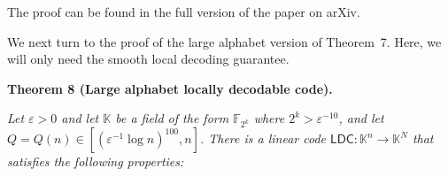 


The proof can be found in the full version of the paper on arXiv.\par




We next turn to the proof of the large alphabet version of Theorem 7. Here, we will only need the smooth local decoding guarantee.\par





\par\medskip\noindent\textbf{
\textbf{Theorem 8}\textbf{ }(Large alphabet locally decodable code)\textbf{.}
}\par



\emph{Let $\varepsilon>0$ and let $\mathbb{K}$ be a field of the form $\mathbb{F}_{2^{k}}$ where $2^{k}>\varepsilon^{-10}$, and let $Q=Q(n)\in[(\varepsilon^{-1}\log n)^{100},n]$. There is a linear code $\mathsf{LDC}:\mathbb{K}^{n}\rightarrow\mathbb{K}^{N}$
that satisfies the following properties:}\par


